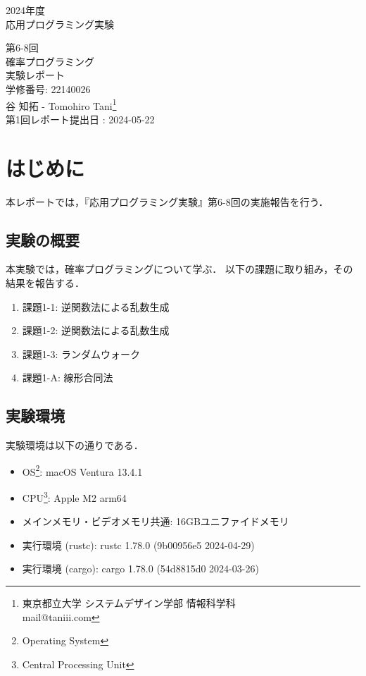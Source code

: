 \documentclass[fleqn, a4paper. 12pt]{jsarticle}
\begin{document}
  \begin{titlepage}
    \begin{center}
      {\Huge 2024年度\\応用プログラミング実験}
      
      \vspace{4cm}
      {\Huge 第6-8回\\確率プログラミング\\
        実験レポート\\
      }
      \vspace{4cm}
      {\large 学修番号: 22140026\\谷 知拓 - Tomohiro Tani\footnote{東京都立大学 システムデザイン学部 情報科学科 \\ mail@taniii.com} \\}
      \vspace{0.5cm}
      {\large
        第1回レポート提出日 : 2024-05-22
      }
    \end{center}
  \end{titlepage}

  \section*{はじめに}

    本レポートでは，『応用プログラミング実験』第6-8回の実施報告を行う．

  \subsection*{実験の概要}

    本実験では，確率プログラミングについて学ぶ．
    以下の課題に取り組み，その結果を報告する．

    \begin{enumerate}
      \item 課題1-1: 逆関数法による乱数生成
      \item 課題1-2: 逆関数法による乱数生成
      \item 課題1-3: ランダムウォーク
      \item 課題1-A: 線形合同法
    \end{enumerate}

  \subsection*{実験環境}

    実験環境は以下の通りである．

    \begin{itemize}
      \item OS\footnote{Operating System}: macOS Ventura 13.4.1
      \item CPU\footnote{Central Processing Unit}: Apple M2 arm64\footnotemark[4]
      \item メインメモリ・ビデオメモリ共通: 16GBユニファイドメモリ\footnotemark[4]
      \item 実行環境 (rustc): rustc 1.78.0 (9b00956e5 2024-04-29)
      \item 実行環境 (cargo): cargo 1.78.0 (54d8815d0 2024-03-26)
    \end{itemize}
\end{document}
